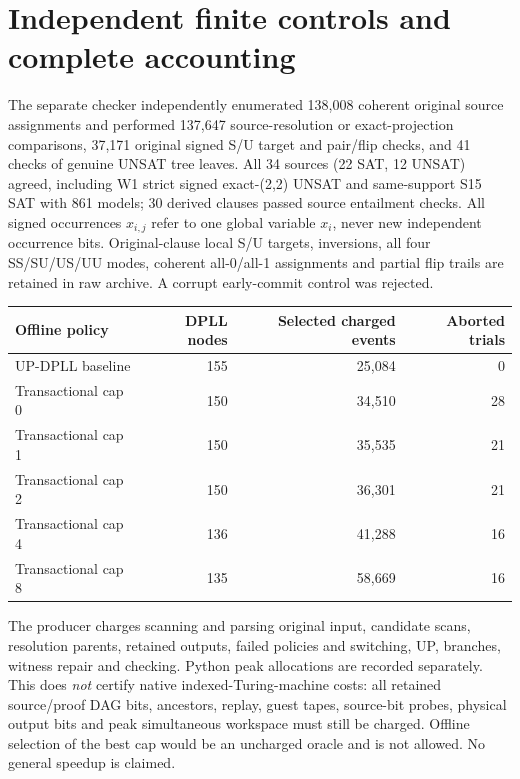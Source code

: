 \documentclass[11pt]{article}
\begin{document}
\section{Independent finite controls and complete accounting}
The separate checker independently enumerated 138,008 coherent original source assignments and performed 137,647 source-resolution or exact-projection comparisons, 37,171 original signed S/U target and pair/flip checks, and 41 checks of genuine UNSAT tree leaves. All 34 sources (22 SAT, 12 UNSAT) agreed, including W1 strict signed exact-(2,2) UNSAT and same-support S15 SAT with 861 models; 30 derived clauses passed source entailment checks. All signed occurrences $x_{i,j}$ refer to one global variable $x_i$, never new independent occurrence bits. Original-clause local S/U targets, inversions, all four SS/SU/US/UU modes, coherent all-0/all-1 assignments and partial flip trails are retained in raw archive. A corrupt early-commit control was rejected.

\begin{center}\begin{tabular}{lrrr}\toprule
Offline policy & DPLL nodes & Selected charged events & Aborted trials\\\midrule
UP-DPLL baseline &155&25,084&0\\
Transactional cap 0&150&34,510&28\\
Transactional cap 1&150&35,535&21\\
Transactional cap 2&150&36,301&21\\
Transactional cap 4&136&41,288&16\\
Transactional cap 8&135&58,669&16\\\bottomrule
\end{tabular}\end{center}

The producer charges scanning and parsing original input, candidate scans, resolution parents, retained outputs, failed policies and switching, UP, branches, witness repair and checking. Python peak allocations are recorded separately. This does \emph{not} certify native indexed-Turing-machine costs: all retained source/proof DAG bits, ancestors, replay, guest tapes, source-bit probes, physical output bits and peak simultaneous workspace must still be charged. Offline selection of the best cap would be an uncharged oracle and is not allowed. No general speedup is claimed.
\end{document}
